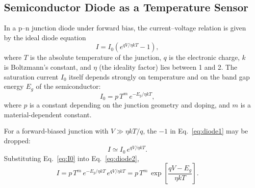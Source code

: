 \documentclass[11pt,a4paper]{article}
\begin{document}
\subsection{Semiconductor Diode as a Temperature Sensor}
In a p--n junction diode under forward bias, the current--voltage relation is given by the ideal diode equation
\begin{equation}
    I = I_0\left(e^{qV/\eta k T} - 1\right),
    \label{eq:diode1}
\end{equation}
where $T$ is the absolute temperature of the junction, $q$ is the electronic charge, $k$ is Boltzmann's constant, and $\eta$ (the ideality factor) lies between 1 and 2. The saturation current $I_0$ itself depends strongly on temperature and on the band gap energy $E_g$ of the semiconductor:
\begin{equation}
    I_0 = p\,T^{m}\, e^{-E_g/\eta k T},
    \label{eq:I0}
\end{equation}
where $p$ is a constant depending on the junction geometry and doping, and $m$ is a material-dependent constant.

For a forward-biased junction with $V \gg \eta k T/q$, the $-1$ in Eq.~\eqref{eq:diode1} may be dropped:
\begin{equation}
    I \simeq I_0\, e^{qV/\eta k T}.
    \label{eq:diode2}
\end{equation}
Substituting Eq.~\eqref{eq:I0} into Eq.~\eqref{eq:diode2},
\begin{equation}
    I = p\,T^{m}\, e^{-E_g/\eta k T}\, e^{qV/\eta k T}
      = p\,T^{m}\, \exp\!\left[\frac{qV - E_g}{\eta k T}\right].
    \label{eq:diode3}
\end{equation}
\end{document}
